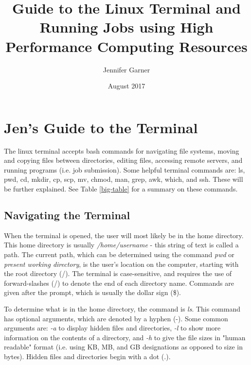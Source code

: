 \documentclass[12pt]{article}
\title{Guide to the Linux Terminal and Running Jobs using High Performance Computing Resources}
\author{Jennifer Garner}
\date{August 2017}
\begin{document}
\maketitle
\newpage
\tableofcontents
\newpage

\section{Jen's Guide to the Terminal}

\quad\enskip\quad The linux terminal accepts bash commands for navigating file systems, moving and copying files between directories, editing files, accessing remote servers, and running programs (i.e. job submission). Some helpful terminal commands are: ls, pwd, cd, mkdir, cp, scp, mv, chmod, man, grep, awk, which, and ssh. These will be further explained. See Table \ref{big-table} for a summary on these commands.

\subsection{Navigating the Terminal}

\quad\enskip\quad When the terminal is opened, the user will most likely be in the home directory. This home directory is usually \textit{/home/username} - this string of text is called a path. The current path, which can be determined using the command \textit{pwd} or \textit{present working directory}, is the user's location on the computer, starting with the root directory (/). The terminal is case-sensitive, and requires the use of forward-slashes (/) to denote the end of each directory name. Commands are given after the prompt, which is usually the dollar sign (\$). 

\quad To determine what is in the home directory, the command is \textit{ls}. This command has optional arguments, which are denoted by a hyphen (-). Some common arguments are: \textit{-a} to display hidden files and directories, \textit{-l} to show more information on the contents of a directory, and \textit{-h} to give the file sizes in "human readable" format (i.e. using KB, MB, and GB designations as opposed to size in bytes). Hidden files and directories begin with a dot (.).
\end{document}
